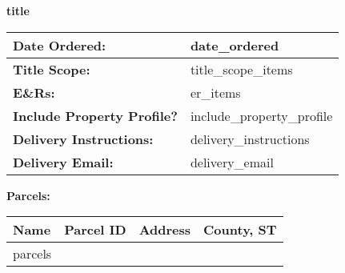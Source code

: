 \documentclass[12pt]{article}
\begin{document}
\setlength{\parindent}{0pt}
\setlength{\tabcolsep}{3pt}

\begin{center}
\Large\textbf{{{title}}}
\end{center}

\vspace{1em}
\noindent
{\setlength{\baselineskip}{0em}%
 \setlength{\parskip}{0pt}%
\begin{tabular}{>{\raggedleft\arraybackslash}m{1.8in}|m{5.5in}}
    \textbf{Date Ordered:} & {{date_ordered}} \\ \hline
    \textbf{Title Scope:} & {{title_scope_items}} \\ \hline
    \textbf{E\&Rs:} & {{er_items}} \\ \hline
    \textbf{Include Property Profile?} & {{include_property_profile}} \\ \hline
    \textbf{Delivery Instructions:} & {{delivery_instructions}} \\ \hline
    \textbf{Delivery Email:} & {{delivery_email}} \\ \hline
\end{tabular}}

\vspace{1em}
\noindent\textbf{Parcels:}
\vspace{0.5em}

\noindent
\begin{tabular}{|p{0.9in}|p{1.8in}|p{3.0in}|p{1.4in}|}
    \hline
    \textbf{Name} & \textbf{Parcel ID} & \textbf{Address} & \textbf{County, ST} \\
    \hline
    {{parcels}}
\end{tabular}
\end{document}
